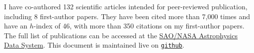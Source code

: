 I have co-authored 132 scientific articles intended for peer-reviewed 
publication, including 8 first-author papers. They have been cited more than 
7,000 times and have an $h$-index of 46, with more than 350 citations on my 
first-author papers. The full list of publications can be accessed at the 
\href{https://goo.gl/LAu9G4}{SAO/NASA Astrophysics Data System}.
%
This document is maintained live on
\href{https://github.com/cristobal-sifon/cv/blob/master/Sifon_publications.pdf}{\texttt{github}}.

